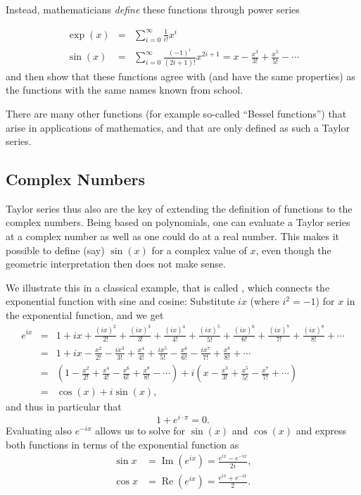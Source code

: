 Instead, mathematicians {\em define} these functions through power series

\begin{eqnarray*}
\exp(x)&=&\sum_{i=0}^\infty\frac{1}{i!} x^i\\
\sin(x)&=&\sum_{i=0}^\infty
\frac{(-1)^i}{(2i+1)!}x^{2i+1}=x-\frac{x^3}{3!}+\frac{x^5}{5!}-\cdots
\end{eqnarray*}
and then show that these functions agree with (and have the same properties)
as the functions with the same names known from school.
\smallskip

There are many other functions (for example so-called ``Bessel functions'')
that arise in applications of mathematics, and that are only defined as such
a Taylor series.

\subsection{Complex Numbers}

Taylor series thus also are the key of extending the definition of functions to
the complex numbers. Being based on polynomials, one can evaluate a Taylor
series at a complex number as well as one could do at a real number. This
makes it possible to define (say) $\sin(x)$ for a complex value of $x$, even
though the geometric interpretation then does not make sense.

We illustrate this in a classical example, that is called , which connects the exponential function with sine and cosine: Substitute $ix$ (where $i^2=-1$)
for $x$ in the exponential function, and we get
\begin{eqnarray*}
 e^{ix} &=& 1 + ix + \frac{(ix)^2}{2!} + \frac{(ix)^3}{3!} + \frac{(ix)^4}{4!} + \frac{(ix)^5}{5!} + \frac{(ix)^6}{6!} + \frac{(ix)^7}{7!} + \frac{(ix)^8}{8!} + \cdots \\
 &=& 1 + ix - \frac{x^2}{2!} - \frac{ix^3}{3!} + \frac{x^4}{4!} + \frac{ix^5}{5!} - \frac{x^6}{6!} - \frac{ix^7}{7!} + \frac{x^8}{8!} + \cdots \\
 &=& \left( 1 - \frac{x^2}{2!} + \frac{x^4}{4!} - \frac{x^6}{6!} + \frac{x^8}{8!} - \cdots \right) + i\left( x - \frac{x^3}{3!} + \frac{x^5}{5!} - \frac{x^7}{7!} + \cdots \right) \\
 &=& \cos(x) + i\sin(x) ,
\end{eqnarray*}
and thus in particular that
\[
1+e^{i\cdot\pi}=0.
\]
Evaluating also $e^{-ix}$ allows us to solve for $\sin(x)$ and $\cos(x)$ and
express both functions in terms of the exponential function as
\begin{eqnarray*}
\sin x &= \operatorname{Im} \left(e^{ix}\right) =\frac{e^{ix} - e^{-ix}}{2i},\\
\cos x &= \operatorname{Re} \left(e^{ix}\right) =\frac{e^{ix} + e^{-ix}}{2}.
\end{eqnarray*}

